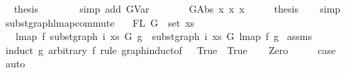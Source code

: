 \begin{isabellebody}
\ \isamarkupfalse%
\ {\isacharquery}{\kern0pt}thesis\isanewline
\ \ \ \ \ \ \isamarkupfalse%
\ {\isacharparenleft}{\kern0pt}simp\ add{\isacharcolon}{\kern0pt}\ GVar{\isacharparenright}{\kern0pt}\isanewline
\ \ \ \isamarkupfalse%
\isanewline
{}\isamarkupfalse%
\isanewline
\ \ \isamarkupfalse%
\ {\isacharparenleft}{\kern0pt}GAbs\ x{}{}\ x{}{}\ x{}{}{\isacharparenright}{\kern0pt}\isanewline
\ \ \isamarkupfalse%
\ \isamarkupfalse%
\ {\isacharquery}{\kern0pt}thesis\isanewline
\ \ \isamarkupfalse%
\ simp\isanewline
{}\isamarkupfalse%
%
\endisatagproof
{\isafoldproof}%
%
\isadelimproof
\isanewline
%
\endisadelimproof
\isanewline
\isanewline
{}\isamarkupfalse%
\ subst{\isacharunderscore}{\kern0pt}graph{\isacharunderscore}{\kern0pt}lmap{\isacharunderscore}{\kern0pt}commute{\isacharcolon}{\kern0pt}\isanewline
\ \ \ {\isachardoublequoteopen}FL\ G\ {\isasymsubseteq}\ set\ xs{\isachardoublequoteclose}\isanewline
\ \ \ {\isachardoublequoteopen}lmap\ f\ {\isacharparenleft}{\kern0pt}subst{\isacharunderscore}{\kern0pt}graph\ i\ xs\ G\ g{}{\isacharparenright}{\kern0pt}\ {\isacharequal}{\kern0pt}\ subst{\isacharunderscore}{\kern0pt}graph\ i\ xs\ G\ {\isacharparenleft}{\kern0pt}lmap\ f\ g{}{\isacharparenright}{\kern0pt}{\isachardoublequoteclose}\isanewline
%
\isadelimproof
%
\endisadelimproof
%
\isatagproof
{}\isamarkupfalse%
\ assms\isanewline
{}\isamarkupfalse%
\ {\isacharparenleft}{\kern0pt}induct\ g{}\ arbitrary{\isacharcolon}{\kern0pt}\ f\ rule{\isacharcolon}{\kern0pt}\ graph{\isachardot}{\kern0pt}induct{\isacharbrackleft}{\kern0pt}of\ {\isacharunderscore}{\kern0pt}\ {\isachardoublequoteopen}{\isacharpercent}{\kern0pt}{\isacharunderscore}{\kern0pt}{\isachardot}{\kern0pt}\ True{\isachardoublequoteclose}\ {\isachardoublequoteopen}{\isacharpercent}{\kern0pt}{\isacharunderscore}{\kern0pt}{\isachardot}{\kern0pt}\ True{\isachardoublequoteclose}{\isacharbrackright}{\kern0pt}{\isacharparenright}{\kern0pt}\isanewline
\ \ \isamarkupfalse%
\ Zero\isanewline
\ \ \isamarkupfalse%
\ \isamarkupfalse%
\ {\isacharquery}{\kern0pt}case\isanewline
\ \ \isamarkupfalse%
\ auto\isanewline
{}\isamarkupfalse%
\isanewline

\end{isabellebody}
